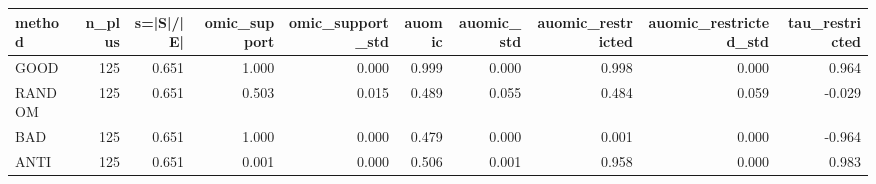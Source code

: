 \begin{tabular}{lrrrrrrrrr}
\toprule
method & n_plus & s=|S|/|E| & omic_support & omic_support_std & auomic & auomic_std & auomic_restricted & auomic_restricted_std & tau_restricted \\
\midrule
GOOD & 125 & 0.651 & 1.000 & 0.000 & 0.999 & 0.000 & 0.998 & 0.000 & 0.964 \\
RANDOM & 125 & 0.651 & 0.503 & 0.015 & 0.489 & 0.055 & 0.484 & 0.059 & -0.029 \\
BAD & 125 & 0.651 & 1.000 & 0.000 & 0.479 & 0.000 & 0.001 & 0.000 & -0.964 \\
ANTI & 125 & 0.651 & 0.001 & 0.000 & 0.506 & 0.001 & 0.958 & 0.000 & 0.983 \\
\bottomrule
\end{tabular}
